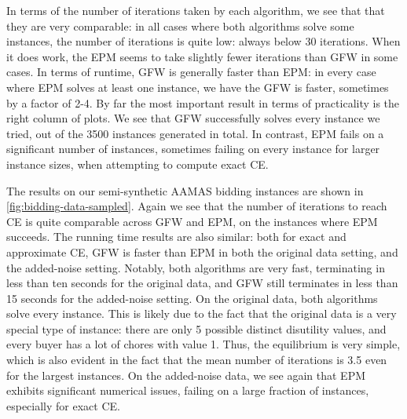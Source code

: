 \documentclass[format=acmsmall,authorversion]{acmart}
\begin{document}
In terms of the number of iterations taken by each algorithm, we see that that they are very comparable: in all cases where both algorithms solve some instances, the number of iterations is quite low: always below 30 iterations. When it does work, the EPM seems to take slightly fewer iterations than GFW in some cases.
In terms of runtime, GFW is generally faster than EPM: in every case where EPM solves at least one instance, we have the GFW is faster, sometimes by a factor of 2-4.
By far the most important result in terms of practicality is the right column of plots. We see that GFW successfully solves every instance we tried, out of the 3500 instances generated in total.
In contrast, EPM fails on a significant number of instances, sometimes failing on every instance for larger instance sizes, when attempting to compute exact CE.

The results on our semi-synthetic AAMAS bidding instances are shown in \cref{fig:bidding-data-sampled}.
Again we see that the number of iterations to reach CE is quite comparable across GFW and EPM, on the instances where EPM succeeds. The running time results are also similar: both for exact and approximate CE, GFW is faster than EPM in both the original data setting, and the added-noise setting. Notably, both algorithms are very fast, terminating in less than ten seconds for the original data, and GFW still terminates in less than 15 seconds for the added-noise setting.
On the original data, both algorithms solve every instance. This is likely due to the fact that the original data is a very special type of instance: there are only 5 possible distinct disutility values, and every buyer has a lot of chores with value 1. Thus, the equilibrium is very simple, which is also evident in the fact that the mean number of iterations is 3.5 even for the largest instances.
On the added-noise data, we see again that EPM exhibits significant numerical issues, failing on a large fraction of instances, especially for exact CE.
\end{document}
